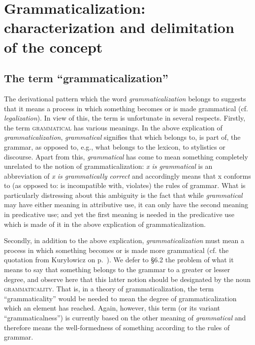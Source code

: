 \chapter{Grammaticalization: characterization and delimitation of the concept} \label{chap:2}

\section{The term ``grammaticalization''} \label{sec:2.1}

The derivational pattern which the word \textit{grammaticalization} belongs to suggests that it means a process in which something becomes or is made grammatical (cf. \textit{legalization}). In view of this, the term is unfortunate in several respects. Firstly, the term \textsc{grammatical} has various meanings. In the above explication of \textit{grammaticalization}, \textit{grammatical} signifies that which belongs to, is part of, the grammar, as opposed to, e.g., what belongs to the lexicon, to stylistics or discourse. Apart from this, \textit{grammatical} has come to mean something completely unrelated to the notion of grammaticalization: \textit{x is grammatical} is an abbreviation of \textit{x is grammatically correct} and accordingly means that x conforms to (as opposed to: is incompatible with, violates) the rules of grammar. What is particularly distressing about this ambiguity is the fact that while \textit{grammatical} may have either meaning in attributive use, it can only have the second meaning in predicative use; and yet the first meaning is needed in the predicative use which is made of it in the above explication of grammaticalization.

Secondly, in addition to the above explication, \textit{grammaticalization} must mean a process in which something becomes or is made  more grammatical (cf. the quotation from Kuryłowicz on p.~\pageref{quote:kurylowciz}). We defer to §6.2 the problem of what it means to say that something belongs to the grammar to a greater or lesser degree, and observe here that this latter notion should be designated by the noun \textsc{grammaticality}. That is, in a theory of grammaticalization, the term ``grammaticality'' would be needed to mean the degree of grammaticalization which an element has reached. Again, however, this term (or its variant ``grammaticalness'') is currently based on the other meaning of \textit{grammatical} and therefore means the well-formedness of something according to the rules of grammar.

